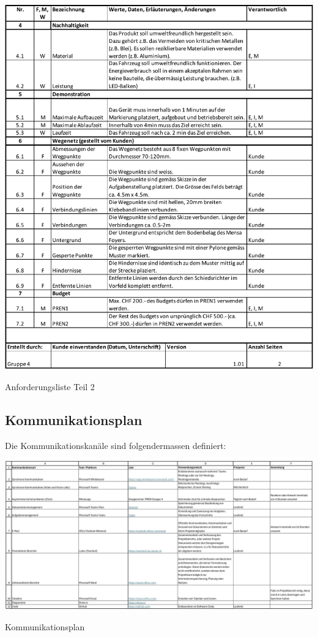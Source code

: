 \begin{table}[H]
\centering
\includegraphics[width=\textwidth]{assets/Anforderungsliste_V1.01_page2.pdf}
\caption{Anforderungsliste Teil 2}
\label{table:anforderungsliste_page2}
\end{table}
\newpage

\begin{landscape}
\subsection{Kommunikationsplan}\label{kommunikationsplan}
Die Kommunikationskanäle sind folgendermassen definiert:

\begin{table}[H]
\centering
\includegraphics[width=240mm]{assets/Kommunikationschnittstellen.pdf}
\caption{Kommunikationsplan}
\label{table:communications-plan}
\end{table}
\end{landscape}

